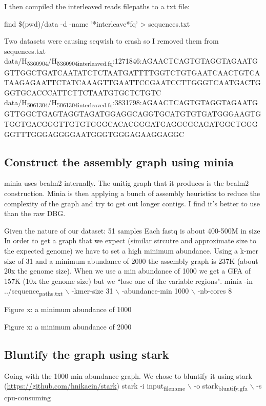 \documentclass[11pt]{article}
\begin{document}
I then compiled the interleaved reads filepaths to a txt file:

find \$(pwd)/data -d -name '*interleave*fq' > sequences.txt

Two datasets were causing seqwish to crash so I removed them from sequences.txt
data/H\textsubscript{536}\textsubscript{09}\textsubscript{04}/H\textsubscript{536}\textsubscript{09}\textsubscript{04}\textsubscript{interleaved.fq}:1271846:AGAACTCAGTGTAGGTAGAATGGTTGGCTGATCAATATCTCTAATGATTTTGGTCTGTGAATCAACTGTCATAAGAGAATTCTATCAAAGTTGAATTCCGAATCCTTGGGTCAATGACTGGGTGCACCCATTCTTCTAATGTGCTCTGTC
data/H\textsubscript{506}\textsubscript{13}\textsubscript{04}/H\textsubscript{506}\textsubscript{13}\textsubscript{04}\textsubscript{interleaved.fq}:3831798:AGAACTCAGTGTAGGTAGAATGGTTGGCTGAGTAGGTAGATGGAGGCAGGTGCATGTGTGATGGGAAGTGTGGTGACGGGTTGTGTGGGCACACGGGATGAGGCGCAGATGGCTGGGGGTTTGGGAGGGGAATGGGTGGGAGAAGGAGGC

\subsection{Construct the assembly graph  using minia}
\label{sec:org193c5ab}
minia uses bcalm2 internally. The unitig graph that it produces is the bcalm2 construction. Minia is then applying a bunch of assembly heuristics to reduce the complexity of the graph and try to get out longer contigs. I find it's better to use than the raw DBG.

Given the nature of our dataset: 
51 samples
Each fastq is about 400-500M in size
In order to get a graph that we expect (similar strcutre and approximate size to the expected genome) we have to set a high minimum abundance.
Using a k-mer size of 31 and a minimum abundance of 2000 the assembly graph is 237K (about 20x the genome size).  When we use a min abundance of 1000 we get a GFA of 157K (10x the genome size) but we “lose one of the variable regions".
minia -in ../sequence\textsubscript{paths.txt} $\backslash$
  -kmer-size 31 $\backslash$
  -abundance-min 1000 $\backslash$
  -nb-cores 8

Figure x: a minimum abundance of 1000

Figure x: a minimum abundance of 2000
\subsection{Bluntify the graph using stark}
\label{sec:org4a58923}
Going with the 1000 min abundance graph. We chose to bluntify it using stark (\url{https://github.com/hnikaein/stark}) 
stark -i input\textsubscript{file}\textsubscript{name} $\backslash$
  -o stark\textsubscript{bluntify.gfa} $\backslash$
  -s cpu-consuming
\end{document}

